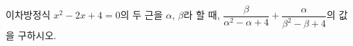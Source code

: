 이차방정식 $x^2-2x+4=0$의 두 근을 $\alpha$, $\beta$라 할 때, $\dfrac{\beta}{\alpha^2-\alpha+4}+\dfrac{\alpha}{\beta^2-\beta+4}$의 값을 구하시오.
